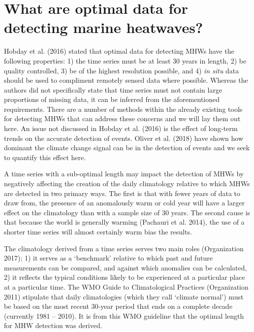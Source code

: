 \documentclass[]{article}
\begin{document}
\hypertarget{what-are-optimal-data-for-detecting-marine-heatwaves}{%
\section{What are optimal data for detecting marine
heatwaves?}\label{what-are-optimal-data-for-detecting-marine-heatwaves}}

Hobday et al. (2016) stated that optimal data for detecting MHWs have
the following properties: 1) the time series must be at least 30 years
in length, 2) be quality controlled, 3) be of the highest resolution
possible, and 4) \emph{in situ} data should be used to compliment
remotely sensed data where possible. Whereas the authors did not
specifically state that time series must not contain large proportions
of missing data, it can be inferred from the aforementioned
requirements. There are a number of methods within the already existing
tools for detecting MHWs that can address these concerns and we will lay
them out here. An issue not discussed in Hobday et al. (2016) is the
effect of long-term trends on the accurate detection of events. Oliver
et al. (2018) have shown how dominant the climate change signal can be
in the detection of events and we seek to quantify this effect here.

A time series with a sub-optimal length may impact the detection of MHWs
by negatively affecting the creation of the daily climatology relative
to which MHWs are detected in two primary ways. The first is that with
fewer years of data to draw from, the presence of an anomalously warm or
cold year will have a larger effect on the climatology than with a
sample size of 30 years. The second cause is that because the world is
generally warming (Pachauri et al. 2014), the use of a shorter time
series will almost certainly warm bias the results.

The climatology derived from a time series serves two main roles
(Organization 2017); 1) it serves as a `benchmark' relative to which
past and future measurements can be compared, and against which
anomalies can be calculated, 2) it reflects the typical conditions
likely to be experienced at a particular place at a particular time. The
WMO Guide to Climatological Practices (Organization 2011) stipulate that
daily climatologies (which they call `climate normal') must be based on
the most recent 30-year period that ends on a complete decade (currently
1981 -- 2010). It is from this WMO guideline that the optimal length for
MHW detection was derived.
\end{document}
